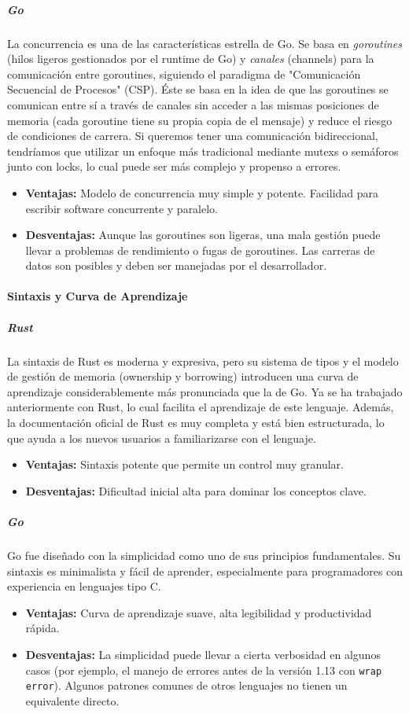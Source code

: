 \subparagraph{Go}
La concurrencia es una de las características estrella de Go. Se basa en \textit{goroutines} (hilos ligeros gestionados por el runtime de Go) y \textit{canales} (channels) para la comunicación entre goroutines, siguiendo el paradigma de "Comunicación Secuencial de Procesos" (CSP).
Éste se basa en la idea de que las goroutines se comunican entre sí a través de canales sin acceder a las mismas posiciones de memoria (cada goroutine tiene su propia copia de el mensaje) y reduce el riesgo de condiciones de carrera.
Si queremos tener una comunicación bidireccional, tendríamos que utilizar un enfoque más tradicional mediante mutexs o semáforos junto con locks, lo cual puede ser más complejo y propenso a errores.
\begin{itemize}
    \item \textbf{Ventajas:} Modelo de concurrencia muy simple y potente. Facilidad para escribir software concurrente y paralelo.
    \item \textbf{Desventajas:} Aunque las goroutines son ligeras, una mala gestión puede llevar a problemas de rendimiento o fugas de goroutines. Las carreras de datos son posibles y deben ser manejadas por el desarrollador.
\end{itemize}

\paragraph{Sintaxis y Curva de Aprendizaje}
\subparagraph{Rust}
La sintaxis de Rust es moderna y expresiva, pero su sistema de tipos y el modelo de gestión de memoria (ownership y borrowing) introducen una curva de aprendizaje considerablemente más pronunciada que la de Go.
Ya se ha trabajado anteriormente con Rust, lo cual facilita el aprendizaje de este lenguaje.
Además, la documentación oficial de Rust es muy completa y está bien estructurada, lo que ayuda a los nuevos usuarios a familiarizarse con el lenguaje.
\begin{itemize}
    \item \textbf{Ventajas:} Sintaxis potente que permite un control muy granular.
    \item \textbf{Desventajas:} Dificultad inicial alta para dominar los conceptos clave.
\end{itemize}

\subparagraph{Go}
Go fue diseñado con la simplicidad como uno de sus principios fundamentales. Su sintaxis es minimalista y fácil de aprender, especialmente para programadores con experiencia en lenguajes tipo C.
\begin{itemize}
    \item \textbf{Ventajas:} Curva de aprendizaje suave, alta legibilidad y productividad rápida.
    \item \textbf{Desventajas:} La simplicidad puede llevar a cierta verbosidad en algunos casos (por ejemplo, el manejo de errores antes de la versión 1.13 con \texttt{wrap error}). Algunos patrones comunes de otros lenguajes no tienen un equivalente directo.
\end{itemize}

